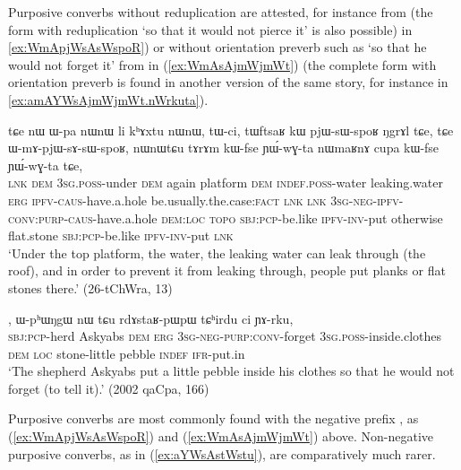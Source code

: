 Purposive converbs without reduplication are attested, for instance  from  (the form with reduplication  `so that it would not pierce it' is also possible) in \ref{ex:WmApjWsAsWspoR}) or without orientation preverb such as  `so that he would not forget it' from  in (\ref{ex:WmAsAjmWjmWt}) (the complete form with orientation preverb is found in another version of the same story, for instance in \ref{ex:amAYWsAjmWjmWt.nWrkuta}).


\begin{exe}
\ex \label{ex:WmApjWsAsWspoR}
\gll  tɕe nɯ ɯ-pa nɯnɯ li kʰɤxtu nɯnɯ, tɯ-ci, tɯftsaʁ kɯ pjɯ-sɯ-spoʁ ŋgrɤl tɕe, tɕe ɯ-mɤ-pjɯ-sɤ-sɯ-spoʁ, nɯnɯtɕu tɤrɤm kɯ-fse ɲɯ́-wɣ-ta nɯmaʁnɤ cupa kɯ-fse ɲɯ́-wɣ-ta tɕe, \\
\textsc{lnk} \textsc{dem} \textsc{3sg}.\textsc{poss}-under \textsc{dem} again platform \textsc{dem} \textsc{indef}.\textsc{poss}-water leaking.water \textsc{erg} \textsc{ipfv}-\textsc{caus}-have.a.hole be.usually.the.case:\textsc{fact} \textsc{lnk} \textsc{lnk} \textsc{3sg}-\textsc{neg}-\textsc{ipfv}-\textsc{conv}:\textsc{purp}-\textsc{caus}-have.a.hole \textsc{dem}:\textsc{loc}  \textsc{topo} \textsc{sbj}:\textsc{pcp}-be.like \textsc{ipfv}-\textsc{inv}-put otherwise  flat.stone \textsc{sbj}:\textsc{pcp}-be.like \textsc{ipfv}-\textsc{inv}-put \textsc{lnk} \\
\glt `Under the top platform, the water, the leaking water can leak through (the roof), and in order to prevent it from leaking through, people put planks or flat stones there.' (26-tChWra, 13)
\end{exe}

\begin{exe}
\ex \label{ex:WmAsAjmWjmWt}
, ɯ-pʰɯŋgɯ nɯ tɕu rdɤstaʁ-pɯpɯ tɕʰirdu ci ɲɤ-rku, \\
 \textsc{sbj}:\textsc{pcp}-herd Askyabs \textsc{dem} \textsc{erg}  \textsc{3sg}-\textsc{neg}-\textsc{purp}:\textsc{conv}-forget \textsc{3sg}.\textsc{poss}-inside.clothes \textsc{dem} \textsc{loc} stone-little pebble \textsc{indef}
 \textsc{ifr}-put.in\\
\glt `The shepherd Askyabs put a little pebble inside his clothes so that he would not forget (to tell it).' (2002 qaCpa, 166)
\end{exe}

Purposive converbs are most commonly found with the negative prefix , as (\ref{ex:WmApjWsAsWspoR}) and (\ref{ex:WmAsAjmWjmWt}) above. Non-negative purposive converbs, as in (\ref{ex:aYWsAstWstu}), are comparatively much rarer.

